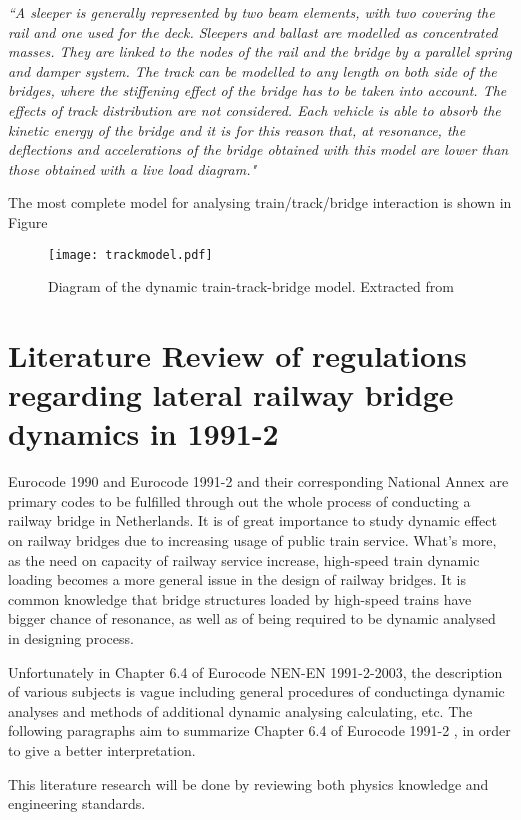 \textit{``A sleeper is generally represented by two beam elements, with two covering the rail and one used for the deck. Sleepers and ballast are modelled as concentrated masses. They are linked to the nodes of the rail and the bridge by a parallel spring and damper system. The track can be modelled to any length on both side of the bridges, where the stiffening effect of the bridge has to be taken into account. The effects of track distribution are not considered. Each vehicle is able to absorb the kinetic energy of the bridge and it is for this reason that, at resonance, the deflections and accelerations of the bridge obtained with this model are lower than those obtained with a live load diagram."}

The most complete model for analysing train/track/bridge interaction is shown in Figure

\begin{figure}[h]
	\centering
	\texttt{[image: trackmodel.pdf]}
	\caption{Diagram of the dynamic train-track-bridge model. Extracted from \cite[Fig. 15]{uic}}
	\label{fig:trackmodel}
\end{figure}


\chapter{Literature Review of regulations regarding lateral railway bridge dynamics in 1991-2} 
Eurocode 1990 and Eurocode 1991-2 and their corresponding National Annex are primary codes to be fulfilled through out the whole process of conducting a railway bridge in Netherlands. It is of great importance to study dynamic effect on railway bridges due to increasing usage of public train service. What's more, as the need on capacity of railway service increase, high-speed train dynamic loading becomes a more general issue in the design of railway bridges. It is common knowledge that bridge structures loaded by high-speed trains have bigger chance of resonance, as well as of being required to be dynamic analysed in designing process. 

Unfortunately in Chapter 6.4 of Eurocode NEN-EN 1991-2-2003, the description of various subjects is vague including general procedures of conductinga dynamic analyses and methods of additional dynamic analysing calculating, etc. The following paragraphs aim to summarize Chapter 6.4 of Eurocode 1991-2 \cite{EC12}, in order to give a better interpretation. 

This literature research will be done by reviewing both physics knowledge and engineering standards.

